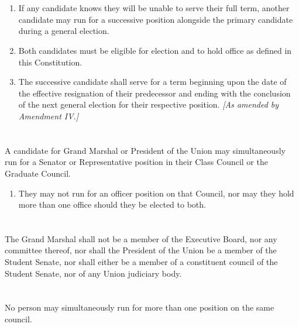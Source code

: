 \documentclass{uniondoc}
\begin{document}
\section{}

\begin{enumerate}
\item If any candidate knows they will be unable to serve their full term, another candidate may run for a successive position alongside the primary candidate during a general election.
\item Both candidates must be eligible for election and to hold office as defined in this Constitution.
\item The successive candidate shall serve for a term beginning upon the date of the effective resignation of their predecessor and ending with the conclusion of the next general election for their respective position. \textit{[As amended by Amendment IV.]}
\end{enumerate}


\section{}

A candidate for Grand Marshal or President of the Union may simultaneously run for a Senator or Representative position in their Class Council or the Graduate Council.

\begin{enumerate}
\item They may not run for an officer position on that Council, nor may they hold more than one office should they be elected to both.
\end{enumerate}

\section{}

The Grand Marshal shall not be a member of the Executive Board, nor any committee thereof, nor shall the President of the Union be a member of the Student Senate, nor shall either be a member of a constituent council of the Student Senate, nor of any Union judiciary body.

\section{}

No person may simultaneously run for more than one position on the same council.
\end{document}

